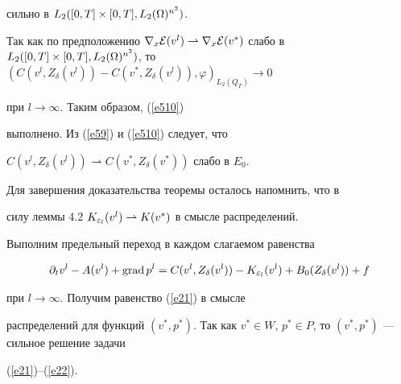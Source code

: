 \begin{pf}
сильно в $L_2([0,T] \times [0,T], L_2(\Omega)^{n^2})$.





Так как по предположению $\nabla_x\E (v^l) \rightharpoonup


\nabla_x \E (v^*)$ слабо в $L_2([0,T] \times [0,T],


L_2(\Om)^{n^2})$, то\linebreak $(C(v^l, Z_{\delta}(v^l)) -


C(v^*, Z_{\delta}(v^l)), \varphi)_{L_2(Q_T)} \to 0$


при $l \to \infty$. Таким образом, (\ref{e510})


выполнено. Из (\ref{e59}) и (\ref{e510}) следует, что


$C(v^l,Z_{\delta}(v^l)) \rightharpoonup


C(v^*, Z_{\delta}(v^*))$ слабо в $E_0$.


Для завершения доказательства теоремы осталось напомнить, что в


силу леммы 4.2 \cite{DZ} $ K_{\eps_l} (v^l) \rightharpoonup K


(v^*)$ в смысле распределений.





Выполним предельный переход в каждом слагаемом равенства


$$


\partial_t v^l-A(v^l)+\grad p^l=


C(v^l, Z_{\delta}(v^l))-K_{\eps_l}(v^l)+B_0(Z_{\delta}(v^l))+f


$$


при $l \to \infty$. Получим равенство (\ref{e21}) в смысле


распределений для функций $(v^*,p^*)$. Так как $v^* \in W$, $p^*


\in P$, то $(v^*,p^*)$ --- сильное решение задачи


(\ref{e21})--(\ref{e22}).


\end{pf}








